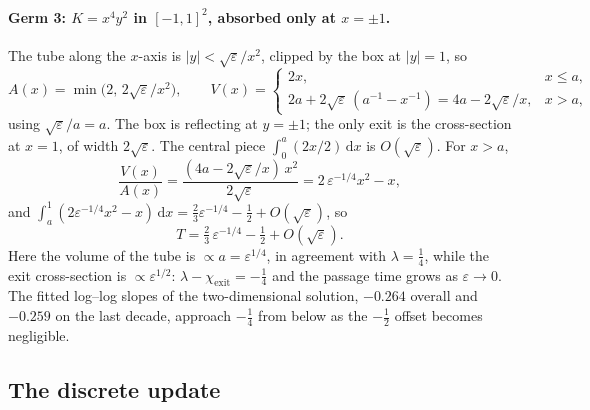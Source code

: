 \documentclass[11pt,a4paper]{article}
\newcommand{\eps}{\varepsilon}
\newcommand{\dd}{\mathrm d}
\newcommand{\chiexit}{\chi_{\mathrm{exit}}}
\begin{document}
\paragraph{Germ 3: $K=x^4y^2$ in $[-1,1]^2$, absorbed only at $x=\pm1$.}
The tube along the $x$-axis is $|y|<\sqrt\eps/x^2$, clipped by the box at
$|y|=1$, so
\begin{equation}
A(x)=\min\bigl(2,\,2\sqrt\eps/x^2\bigr),\qquad
V(x)=\begin{cases}2x,&x\le a,\\[2pt]
2a+2\sqrt\eps\,(a^{-1}-x^{-1})=4a-2\sqrt\eps/x,&x>a,\end{cases}
\end{equation}
using $\sqrt\eps/a=a$. The box is reflecting at $y=\pm1$; the only exit is
the cross-section at $x=1$, of width $2\sqrt\eps$. The central piece
$\int_0^a(2x/2)\,\dd x$ is $O(\sqrt\eps)$. For $x>a$,
\begin{equation}
\frac{V(x)}{A(x)}=\frac{(4a-2\sqrt\eps/x)\,x^2}{2\sqrt\eps}
=2\,\eps^{-1/4}x^2-x,
\end{equation}
and $\int_a^1(2\eps^{-1/4}x^2-x)\,\dd x=\tfrac23\eps^{-1/4}-\tfrac12+O(\sqrt\eps)$, so
\begin{equation}
T=\tfrac23\,\eps^{-1/4}-\tfrac12+O(\sqrt\eps).
\end{equation}
Here the volume of the tube is $\propto a=\eps^{1/4}$, in agreement with
$\lambda=\tfrac14$, while the exit cross-section is $\propto\eps^{1/2}$:
$\lambda-\chiexit=-\tfrac14$ and the passage time grows as $\eps\to0$. The
fitted log--log slopes of the two-dimensional solution, $-0.264$ overall
and $-0.259$ on the last decade, approach $-\tfrac14$ from below as the
$-\tfrac12$ offset becomes negligible.

\subsection{The discrete update}
\label{app:discrete}
\end{document}

